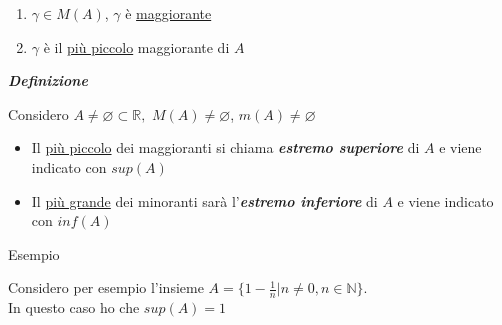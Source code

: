 \documentclass{article}
\theoremstyle{definition}
\begin{document}
\begin{enumerate}
    \item $\gamma \in M(A)$, $\gamma$ è \underline{maggiorante}
    \item $\gamma$ è il \underline{più piccolo} maggiorante di $A$
\end{enumerate}

\begin{center}
    \textbf{\textit{Definizione}}
\end{center}
Considero $A \neq \varnothing \subset \mathbb{R}, \,\, M(A) \neq \varnothing$, $m(A) \neq \varnothing$
\begin{itemize}
\item  Il \underline{più piccolo} dei maggioranti si chiama \textbf{\textit{estremo superiore}} di $A$ e viene indicato con $sup(A)$
\item Il \underline{più grande} dei minoranti sarà l'\textbf{\textit{estremo inferiore}} di $A$ e viene indicato con $inf(A)$

\end{itemize}

\begin{center}
    Esempio
\end{center}
Considero per esempio l'insieme $A=\{1-\frac{1}{n}| n \neq 0, n \in \mathbb{N}\}$.
\\ In questo caso ho che $sup(A)=1$

\begin{center}


\end{center}
\end{document}
